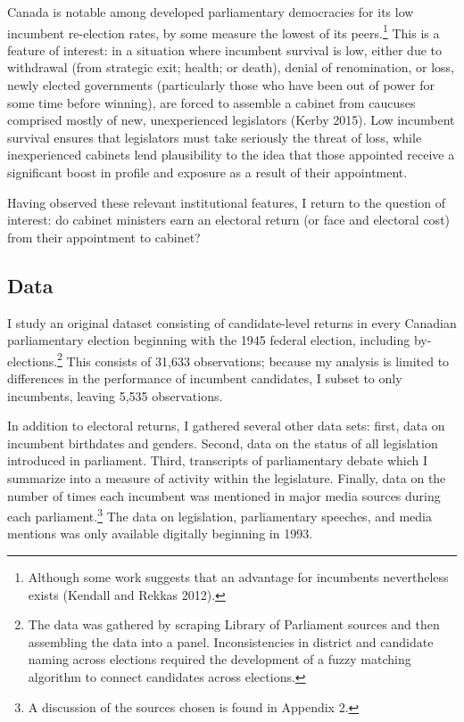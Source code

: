 \documentclass[letter,12pt]{article}
\begin{document}
Canada is notable among developed parliamentary democracies for its low incumbent re-election rates, by some measure the lowest of its peers.\footnote{Although some work suggests that an advantage for incumbents nevertheless exists (Kendall and Rekkas 2012).} This is a feature of interest: in a situation where incumbent survival is low, either due to withdrawal (from strategic exit; health; or death), denial of renomination, or loss, newly elected governments (particularly those who have been out of power for some time before winning), are forced to assemble a cabinet from caucuses comprised mostly of new, unexperienced legislators (Kerby 2015). Low incumbent survival ensures that legislators must take seriously the threat of loss, while inexperienced cabinets lend plausibility to the idea that those appointed receive a significant boost in profile and exposure as a result of their appointment.

Having observed these relevant institutional features, I return to the question of interest: do cabinet ministers earn an electoral return (or face and electoral cost) from their appointment to cabinet?

\subsection*{Data}
I study an original dataset consisting of candidate-level returns in every Canadian parliamentary election beginning with the 1945 federal election, including by-elections.\footnote{The data was gathered by scraping Library of Parliament sources and then assembling the data into a panel. Inconsistencies in district and candidate naming across elections required the development of a fuzzy matching algorithm to connect candidates across elections.} This consists of 31,633 observations; because my analysis is limited to differences in the performance of incumbent candidates, I subset to only incumbents, leaving 5,535 observations.

In addition to electoral returns, I gathered several other data sets: first, data on incumbent birthdates and genders. Second, data on the status of all legislation introduced in parliament. Third, transcripts of parliamentary debate which I summarize into a measure of activity within the legislature. Finally, data on the number of times each incumbent was mentioned in major media sources during each parliament.\footnote{A discussion of the sources chosen is found in Appendix 2.} The data on legislation, parliamentary speeches, and media mentions was only available digitally beginning in 1993.
\end{document}
